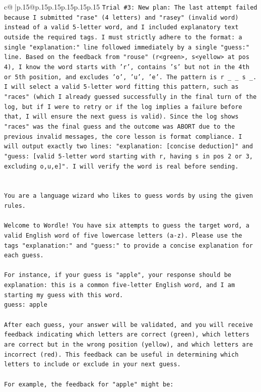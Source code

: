\documentclass{article}
\begin{document}
{\begin{supertabular}{c@{$\;$}|p{.15\linewidth}@{}p{.15\linewidth}p{.15\linewidth}p{.15\linewidth}p{.15\linewidth}p{.15\linewidth}}
{{{\texttt{Trial \#3: New plan: The last attempt failed because I submitted "rase" (4 letters) and "rasey" (invalid word) instead of a valid 5{-}letter word, and I included explanatory text outside the required tags. I must strictly adhere to the format: a single "explanation:" line followed immediately by a single "guess:" line. Based on the feedback from "rouse" (r<green>, s<yellow> at pos 4), I know the word starts with 'r', contains 's' but not in the 4th or 5th position, and excludes 'o', 'u', 'e'. The pattern is r \_ \_ s \_. I will select a valid 5{-}letter word fitting this pattern, such as "races" (which I already guessed successfully in the final turn of the log, but if I were to retry or if the log implies a failure before that, I will ensure the next guess is valid). Since the log shows "races" was the final guess and the outcome was ABORT due to the previous invalid messages, the core lesson is format compliance. I will output exactly two lines: "explanation: {[}concise deduction{]}" and "guess: {[}valid 5{-}letter word starting with r, having s in pos 2 or 3, excluding o,u,e{]}". I will verify the word is real before sending.} \\
\\ 
\\ 
\texttt{You are a language wizard who likes to guess words by using the given rules.} \\
\\ 
\texttt{Welcome to Wordle! You have six attempts to guess the target word, a valid English word of five lowercase letters (a{-}z). Please use the tags "explanation:" and "guess:" to provide a concise explanation for each guess.} \\
\\ 
\texttt{For instance, if your guess is "apple", your response should be} \\
\texttt{explanation: this is a common five{-}letter English word, and I am starting my guess with this word.} \\
\texttt{guess: apple} \\
\\ 
\texttt{After each guess, your answer will be validated, and you will receive feedback indicating which letters are correct (green), which letters are correct but in the wrong position (yellow), and which letters are incorrect (red). This feedback can be useful in determining which letters to include or exclude in your next guess.} \\
\\ 
\texttt{For example, the feedback for "apple" might be:} \\
}}}
\end{supertabular}}
\end{document}
